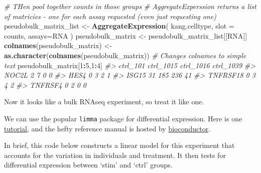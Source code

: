 \documentclass[
]{book}
\newenvironment{Shaded}{\begin{snugshade}}{\end{snugshade}}
\newcommand{\AttributeTok}[1]{\textcolor[rgb]{0.13,0.29,0.53}{#1}}
\newcommand{\CommentTok}[1]{\textcolor[rgb]{0.56,0.35,0.01}{\textit{#1}}}
\newcommand{\DecValTok}[1]{\textcolor[rgb]{0.00,0.00,0.81}{#1}}
\newcommand{\FunctionTok}[1]{\textcolor[rgb]{0.13,0.29,0.53}{\textbf{#1}}}
\newcommand{\NormalTok}[1]{#1}
\newcommand{\OtherTok}[1]{\textcolor[rgb]{0.56,0.35,0.01}{#1}}
\newcommand{\SpecialCharTok}[1]{\textcolor[rgb]{0.81,0.36,0.00}{\textbf{#1}}}
\newcommand{\StringTok}[1]{\textcolor[rgb]{0.31,0.60,0.02}{#1}}
\begin{document}
\begin{Shaded}
\begin{Highlighting}[]
\CommentTok{\# THen pool together counts in those groups}
\CommentTok{\# AggregateExperssion returns a list of matricies {-} one for each assay requested (even just requesting one)}
\NormalTok{pseudobulk\_matrix\_list }\OtherTok{\textless{}{-}} \FunctionTok{AggregateExpression}\NormalTok{( kang.celltype,  }\AttributeTok{slot =} \StringTok{\textquotesingle{}counts\textquotesingle{}}\NormalTok{, }\AttributeTok{assays=}\StringTok{\textquotesingle{}RNA\textquotesingle{}}\NormalTok{ )}
\NormalTok{pseudobulk\_matrix      }\OtherTok{\textless{}{-}}\NormalTok{ pseudobulk\_matrix\_list[[}\StringTok{\textquotesingle{}RNA\textquotesingle{}}\NormalTok{]]}
\FunctionTok{colnames}\NormalTok{(pseudobulk\_matrix) }\OtherTok{\textless{}{-}} \FunctionTok{as.character}\NormalTok{(}\FunctionTok{colnames}\NormalTok{(pseudobulk\_matrix)) }\CommentTok{\# Changes colnames to simple text}
\NormalTok{pseudobulk\_matrix[}\DecValTok{1}\SpecialCharTok{:}\DecValTok{5}\NormalTok{,}\DecValTok{1}\SpecialCharTok{:}\DecValTok{4}\NormalTok{]}
\CommentTok{\#\textgreater{}          ctrl\_101 ctrl\_1015 ctrl\_1016 ctrl\_1039}
\CommentTok{\#\textgreater{} NOC2L           2         7         0         0}
\CommentTok{\#\textgreater{} HES4            0         3         2         1}
\CommentTok{\#\textgreater{} ISG15          31       185       236        41}
\CommentTok{\#\textgreater{} TNFRSF18        0         3         4         2}
\CommentTok{\#\textgreater{} TNFRSF4         0         2         0         0}
\end{Highlighting}
\end{Shaded}

Now it looks like a bulk RNAseq experiment, so treat it like one.

We can use the popular \texttt{limma} package for differential expression. Here is one \href{https://ucdavis-bioinformatics-training.github.io/2018-June-RNA-Seq-Workshop/thursday/DE.html}{tutorial}, and the hefty reference manual is hosted by \href{https://bioconductor.org/packages/release/bioc/html/limma.html}{bioconductor}.

In brief, this code below constructs a linear model for this experiment that accounts for the variation in individuals and treatment. It then tests for differential expression between `stim' and `ctrl' groups.
\end{document}
